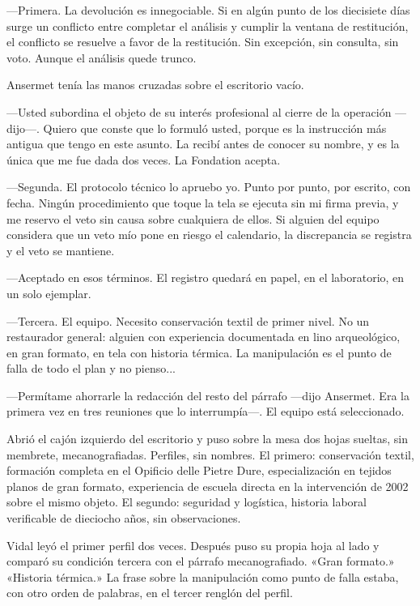 ---Primera. La devolución es innegociable. Si en algún punto de los diecisiete días surge un conflicto entre completar el análisis y cumplir la ventana de restitución, el conflicto se resuelve a favor de la restitución. Sin excepción, sin consulta, sin voto. Aunque el análisis quede trunco.

Ansermet tenía las manos cruzadas sobre el escritorio vacío.

---Usted subordina el objeto de su interés profesional al cierre de la operación ---dijo---. Quiero que conste que lo formuló usted, porque es la instrucción más antigua que tengo en este asunto. La recibí antes de conocer su nombre, y es la única que me fue dada dos veces. La Fondation acepta.

---Segunda. El protocolo técnico lo apruebo yo. Punto por punto, por escrito, con fecha. Ningún procedimiento que toque la tela se ejecuta sin mi firma previa, y me reservo el veto sin causa sobre cualquiera de ellos. Si alguien del equipo considera que un veto mío pone en riesgo el calendario, la discrepancia se registra y el veto se mantiene.

---Aceptado en esos términos. El registro quedará en papel, en el laboratorio, en un solo ejemplar.

---Tercera. El equipo. Necesito conservación textil de primer nivel. No un restaurador general: alguien con experiencia documentada en lino arqueológico, en gran formato, en tela con historia térmica. La manipulación es el punto de falla de todo el plan y no pienso...

---Permítame ahorrarle la redacción del resto del párrafo ---dijo Ansermet. Era la primera vez en tres reuniones que lo interrumpía---. El equipo está seleccionado.

Abrió el cajón izquierdo del escritorio y puso sobre la mesa dos hojas sueltas, sin membrete, mecanografiadas. Perfiles, sin nombres. El primero: conservación textil, formación completa en el Opificio delle Pietre Dure, especialización en tejidos planos de gran formato, experiencia de escuela directa en la intervención de 2002 sobre el mismo objeto. El segundo: seguridad y logística, historia laboral verificable de dieciocho años, sin observaciones.

Vidal leyó el primer perfil dos veces. Después puso su propia hoja al lado y comparó su condición tercera con el párrafo mecanografiado. «Gran formato.» «Historia térmica.» La frase sobre la manipulación como punto de falla estaba, con otro orden de palabras, en el tercer renglón del perfil.

